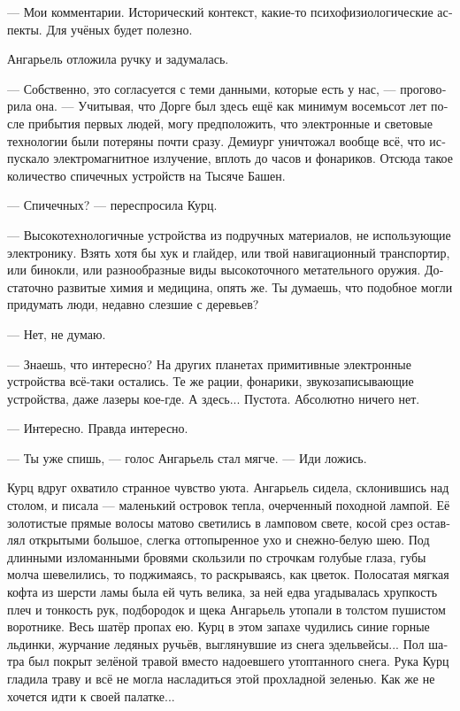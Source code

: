 \documentclass[a4paper,12pt,fleqn]{book}\usepackage{cooltooltips}\usepackage{polyglossia}\setdefaultlanguage[babelshorthands=true]{russian}\setotherlanguage{english}\defaultfontfeatures{Ligatures=TeX,Mapping=tex-text} \usepackage{xcolor}\definecolor{lightgray}{HTML}{bbbbbb}\color{lightgray}\newcommand{\ml}[3]{\textenglish{\textcolor{black}{#3}}}
\begin{document}
--- Мои комментарии.
Исторический контекст, какие-то психофизиологические аспекты.
Для учёных будет полезно.

Ангарьель отложила ручку и задумалась.

--- Собственно, это согласуется с теми данными, которые есть у нас, --- проговорила она.
--- Учитывая, что Дорге был здесь ещё как минимум восемьсот лет после прибытия первых людей, могу предположить, что электронные и световые технологии были потеряны почти сразу.
Демиург уничтожал вообще всё, что испускало электромагнитное излучение, вплоть до часов и фонариков.
Отсюда такое количество спичечных устройств на Тысяче Башен.

--- Спичечных? --- переспросила Курц.

--- Высокотехнологичные устройства из подручных материалов, не использующие электронику.
Взять хотя бы хук и глайдер, или твой навигационный транспортир, или бинокли, или разнообразные виды высокоточного метательного оружия.
Достаточно развитые химия и медицина, опять же.
Ты думаешь, что подобное могли придумать люди, недавно слезшие с деревьев?

--- Нет, не думаю.

--- Знаешь, что интересно?
На других планетах примитивные электронные устройства всё-таки остались.
Те же рации, фонарики, звукозаписывающие устройства, даже лазеры кое-где.
А здесь...
Пустота.
Абсолютно ничего нет.

--- Интересно.
Правда интересно.

--- Ты уже спишь, --- голос Ангарьель стал мягче.
--- Иди ложись.

Курц вдруг охватило странное чувство уюта.
Ангарьель сидела, склонившись над столом, и писала --- маленький островок тепла, очерченный походной лампой.
Её золотистые прямые волосы матово светились в ламповом свете, косой срез оставлял открытыми большое, слегка оттопыренное ухо и снежно-белую шею.
Под длинными изломанными  бровями скользили по строчкам голубые глаза, губы молча шевелились, то поджимаясь, то раскрываясь, как цветок.
Полосатая мягкая кофта из шерсти ламы была ей чуть велика, за ней едва угадывалась хрупкость плеч и тонкость рук, подбородок и щека Ангарьель утопали в толстом пушистом воротнике.
Весь шатёр пропах ею.
Курц в этом запахе чудились синие горные льдинки, журчание ледяных ручьёв, выглянувшие из снега эдельвейсы...
Пол шатра был покрыт зелёной травой вместо надоевшего утоптанного снега.
Рука Курц гладила траву и всё не могла насладиться этой прохладной зеленью.
Как же не хочется идти к своей палатке...
\end{document}
